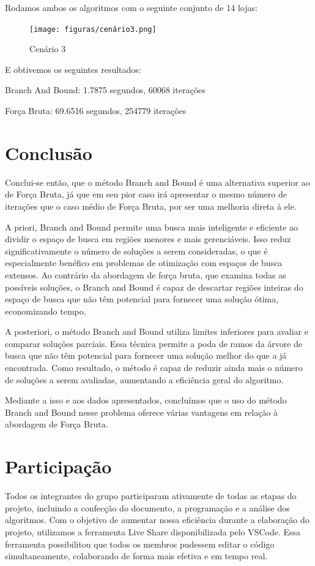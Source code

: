 Rodamos ambos os algoritmos com o seguinte conjunto de 14 lojas:
\begin{figure}[!ht]
	\centering	
	\caption[\hspace{0.1cm}Cenário 3]{Cenário 3}
	  \vspace{-0.4cm}
	\texttt{[image: figuras/cenário3.png]}
\end{figure}

E obtivemos os seguintes resultados:

Branch And Bound: 1.7875 segundos, 60068 iterações

Força Bruta: 69.6516 segundos, 254779 iterações

\section{Conclusão}
Conclui-se então, que o método Branch and Bound é uma alternativa superior ao de Força Bruta, já que em seu pior caso irá apresentar o mesmo número de iterações que o caso médio de Força Bruta, por ser uma melhoria direta à ele.

A priori, Branch and Bound permite uma busca mais inteligente e eficiente ao dividir o espaço de busca em regiões menores e mais gerenciáveis. Isso reduz significativamente o número de soluções a serem consideradas, o que é especialmente benéfico em problemas de otimização com espaços de busca extensos. Ao contrário da abordagem de força bruta, que examina todas as possíveis soluções, o Branch and Bound é capaz de descartar regiões inteiras do espaço de busca que não têm potencial para fornecer uma solução ótima, economizando tempo.

A posteriori, o método Branch and Bound utiliza limites inferiores para avaliar e comparar soluções parciais. Essa técnica permite a poda de ramos da árvore de busca que não têm potencial para fornecer uma solução melhor do que a já encontrada. Como resultado, o método é capaz de reduzir ainda mais o número de soluções a serem avaliadas, aumentando a eficiência geral do algoritmo.

Mediante a isso e aos dados apresentados, concluímos que o uso do método Branch and Bound nesse problema oferece várias vantagens em relação à abordagem de Força Bruta.

\section{Participação}
Todos os integrantes do grupo participaram ativamente de todas as etapas do projeto, incluindo a confecção do documento, a programação e a análise dos algoritmos. Com o objetivo de aumentar nossa eficiência durante a elaboração do projeto, utilizamos a ferramenta Live Share disponibilizada pelo VSCode. Essa ferramenta possibilitou que todos os membros pudessem editar o código simultaneamente, colaborando de forma mais efetiva e em tempo real.

